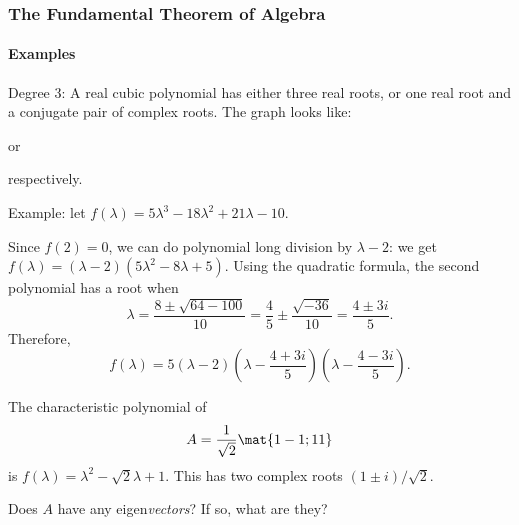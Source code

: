 
\begin{frame}
\frametitle{The Fundamental Theorem of Algebra}
\framesubtitle{Examples}

\alert{Degree $3$:}
A real cubic polynomial has either
\pause
three real roots, or
\pause
one real root and a conjugate pair of complex roots.
\pause
The graph looks like:
\begin{center}
\quad or \quad
{}
\end{center}
respectively.

\pause\medskip
\alert{Example:} let
$f(\lambda) = 5\lambda^3 - 18\lambda^2 + 21\lambda - 10$.\\[1mm]
\begin{webonly}
Since $f(2) = 0$, we can do polynomial long division by $\lambda-2$: we get
$f(\lambda) = (\lambda-2)\left( 5\lambda^2-8\lambda+5 \right)$.
Using the quadratic formula, the second polynomial has a root when
\[ \lambda = \frac{8 \pm \sqrt{64-100}}{10}
= \frac 45 \pm \frac{\sqrt{-36}}{10}
= \frac{4 \pm 3i}5. \]
Therefore,
\[ f(\lambda) = 5(\lambda-2)\left( \lambda-\frac{4+3i}5 \right)
\left( \lambda-\frac{4-3i}5 \right). \]
\end{webonly}

\end{frame}



\begin{pollframe}

\bigskip
The characteristic polynomial of 
\[ A = \frac 1{\sqrt 2}\mat{1 -1; 1 1} \]
is $f(\lambda) = \lambda^2-\sqrt 2\lambda+1$.  This has two complex roots
$(1\pm i)/\sqrt 2$.

\pause\bigskip
\begin{bluebox}[Poll]{.8\linewidth}
  Does $A$ have any eigen\emph{vectors}?  If so, what are they?
\end{bluebox}

\end{pollframe}


